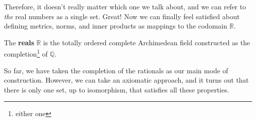   Therefore, it doesn't really matter which one we talk about, and we can refer to \textit{the} real numbers as a single set. Great! Now we can finally feel satisfied about defining metrics, norms, and inner products as mappings to the codomain $\mathbb{R}$. 

  \begin{definition}
    The \textbf{reals} $\mathbb{R}$ is the totally ordered complete Archimedean field constructed as the completion\footnote{either one} of $\mathbb{Q}$. 
  \end{definition}

  So far, we have taken the completion of the rationals as our main mode of construction. However, we can take an axiomatic approach, and it turns out that there is only one set, up to isomorphism, that satisfies all these properties. 

